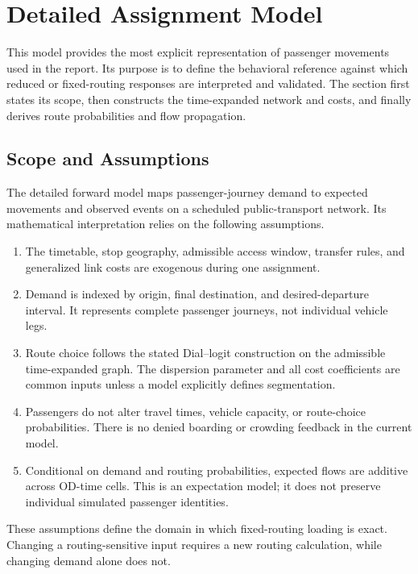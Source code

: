 
\section{Detailed Assignment Model}

This model provides the most explicit representation of passenger movements
used in the report. Its purpose is to define the behavioral reference against
which reduced or fixed-routing responses are interpreted and validated. The
section first states its scope, then constructs the time-expanded network and
costs, and finally derives route probabilities and flow propagation.

\subsection{Scope and Assumptions}

The detailed forward model maps passenger-journey demand to expected movements
and observed events on a scheduled public-transport network.  Its mathematical
interpretation relies on the following assumptions.
\begin{enumerate}
  \item The timetable, stop geography, admissible access window, transfer
        rules, and generalized link costs are exogenous during one assignment.
  \item Demand is indexed by origin, final destination, and desired-departure
        interval.  It represents complete passenger journeys, not individual
        vehicle legs.
  \item Route choice follows the stated Dial--logit construction on the
        admissible time-expanded graph.  The dispersion parameter and all cost
        coefficients are common inputs unless a model explicitly defines
        segmentation.
  \item Passengers do not alter travel times, vehicle capacity, or route-choice
        probabilities.  There is no denied boarding or crowding feedback in
        the current model.
  \item Conditional on demand and routing probabilities, expected flows are
        additive across OD-time cells.  This is an expectation model; it does
        not preserve individual simulated passenger identities.
\end{enumerate}
These assumptions define the domain in which fixed-routing loading is exact.
Changing a routing-sensitive input requires a new routing calculation, while
changing demand alone does not.

